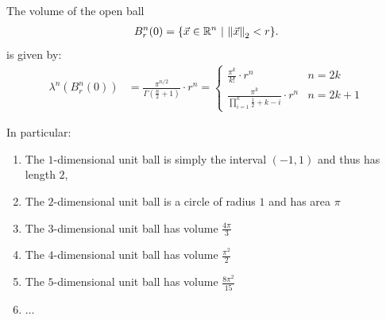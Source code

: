 \pagebreak
\begin{corollary}
	The volume of the open ball
	\begin{align*}
		B^n_r(0) = \qty{\vec{x}\in \mathbb{R}^n ~\middle|~\norm{\vec{x}}_2 < r}.
	\end{align*}
	is given by:
	\begin{align*}
		\lambda^n(B^n_r(0))
		&=
		\frac{\pi^{n/2}}{\Gamma(\frac{n}{2}+1)} \cdot r^n
		=
		\begin{cases}
			\frac{\pi^k}{k!} \cdot r^n & n = 2k\\
			\frac{\pi^k}{\prod_{i = 1}^k \frac{1}{2} + k - i} \cdot r^n & n = 2k + 1
		\end{cases}
	\end{align*}
\end{corollary}
In particular:
\begin{enumerate}
	\item The $1$-dimensional unit ball is simply the interval $(-1,1)$ and thus has length $2$,
	\item The $2$-dimensional unit ball is a circle of radius $1$ and has area $\pi$
	\item The $3$-dimensional unit ball has volume
	$\frac{4\pi}{3}$
	\item The $4$-dimensional unit ball has volume $\frac{\pi^2}{2}$
	\item The $5$-dimensional unit ball has volume $\frac{8\pi^2}{15}$
	\item $\hdots$
\end{enumerate}
